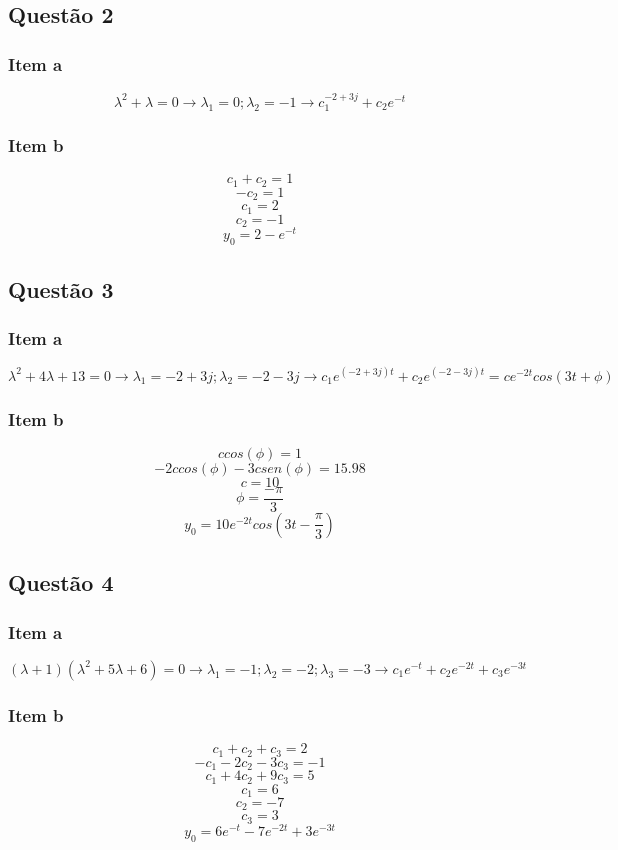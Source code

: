 \documentclass[a4paper, 12pt]{article}
\begin{document}
    \subsection{Quest\~{a}o 2}
    \subsubsection{Item a}   
    \[ \lambda^{2} + \lambda = 0 \rightarrow  \lambda_{1} = 0; \lambda_{2} = -1 \rightarrow c_{1}^{-2+3j} +c_{2}e^{-t}\]   
    \subsubsection{Item b}
    \[c_{1} + c_{2} = 1 \]
    \[-c_{2} = 1 \]
    \[c_{1} =  2\]
    \[c_{2} =  -1\]    
    \[y_{0} = 2 -e^{-t} \]    
    \subsection{Quest\~{a}o 3}
    \subsubsection{Item a}   
    \[\lambda^{2} + 4\lambda + 13 = 0 \rightarrow  \lambda_{1} = -2 + 3j; \lambda_{2} = -2 -3j \rightarrow c_{1}e^{(-2+3j)t} +c_{2}e^{(-2-3j)t} = ce^{-2t}cos(3t + \phi)\]   
    \subsubsection{Item b}
    \[ccos(\phi) = 1 \]
    \[-2ccos(\phi) -3csen(\phi) = 15.98 \]
    \[c =  10\]
    \[\phi =  \frac{-\pi}{3}\]    
    \[y_{0} = 10e^{-2t}cos(3t - \frac{\pi}{3}) \]      
    \subsection{Quest\~{a}o 4}
    \subsubsection{Item a}   
    \[ (\lambda + 1)(\lambda^{2} + 5\lambda + 6) = 0 \rightarrow  \lambda_{1} = -1; \lambda_{2} = -2; \lambda_{3} = -3 \rightarrow c_{1}e^{-t} +c_{2}e^{-2t} + c_{3}e^{-3t}\]   
    \subsubsection{Item b}
    \[c_{1} + c_{2} + c_{3}  = 2 \]
    \[-c_{1} -2c_{2} -3c_{3} = -1 \]
    \[c_{1} +4c_{2} +9c_{3} =  5\]
    \[c_{1} =  6\]    
    \[c_{2} =  -7\]
    \[c_{3} =  3\]
    \[y_{0} =  6e^{-t} -7e^{-2t} + 3e^{-3t}\]   
\end{document}
